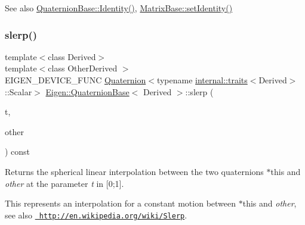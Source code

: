 \begin{DoxySeeAlso}{See also}
\mbox{\hyperlink{class_eigen_1_1_quaternion_base_a2e095881344a2538041df4fea938b2e0}{Quaternion\+Base\+::\+Identity()}}, \mbox{\hyperlink{class_eigen_1_1_matrix_base_ae05be7fcc1ade707f0b73eb5f9d8cf33}{Matrix\+Base\+::set\+Identity()}} 
\end{DoxySeeAlso}
\mbox{\label{class_eigen_1_1_quaternion_base_a0428d9745a54936f05d0aff86a3bb8fd}} 
\subsubsection{\texorpdfstring{slerp()}{slerp()}}
{\footnotesize\ttfamily template$<$class Derived$>$ \\
template$<$class Other\+Derived $>$ \\
E\+I\+G\+E\+N\+\_\+\+D\+E\+V\+I\+C\+E\+\_\+\+F\+U\+NC \mbox{\hyperlink{class_eigen_1_1_quaternion}{Quaternion}}$<$typename \mbox{\hyperlink{struct_eigen_1_1internal_1_1traits}{internal\+::traits}}$<$Derived$>$\+::Scalar$>$ \mbox{\hyperlink{class_eigen_1_1_quaternion_base}{Eigen\+::\+Quaternion\+Base}}$<$ Derived $>$\+::slerp (\begin{DoxyParamCaption}\item[{const Scalar \&}]{t,  }\item[{const \mbox{\hyperlink{class_eigen_1_1_quaternion_base}{Quaternion\+Base}}$<$ Other\+Derived $>$ \&}]{other }\end{DoxyParamCaption}) const}

\begin{DoxyReturn}{Returns}
the spherical linear interpolation between the two quaternions {\ttfamily $\ast$this} and {\itshape other} at the parameter {\itshape t} in \mbox{[}0;1\mbox{]}.
\end{DoxyReturn}
This represents an interpolation for a constant motion between {\ttfamily $\ast$this} and {\itshape other}, see also \href{http://en.wikipedia.org/wiki/Slerp}{\texttt{ http\+://en.\+wikipedia.\+org/wiki/\+Slerp}}. \mbox{\label{class_eigen_1_1_quaternion_base_a5370cf77843374a5adefca3f78770961}} 
